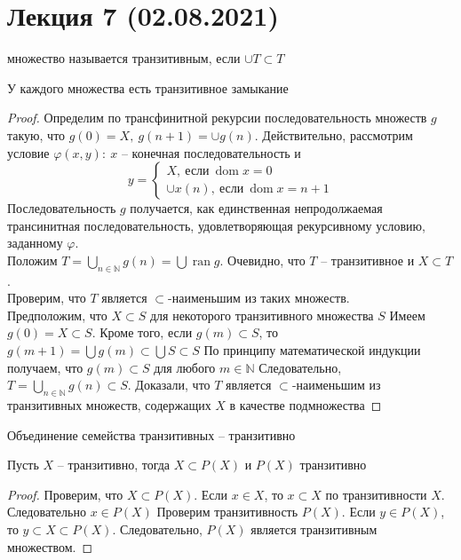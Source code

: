 \section{Лекция 7 (02.08.2021)}

\begin{defn}
множество называется транзитивным, если $\cup T \subset T$
\end{defn}

\begin{lem}
 У каждого множества есть транзитивное замыкание
\end{lem}
\begin{proof}
Определим по трансфинитной рекурсии последовательность множеств $g$ такую, что $g(0) = X,\ g(n+1) = \cup g(n)$. Действительно, рассмотрим условие $\varphi(x,y):\ x$ -- конечная последовательность и
$$
y =
\begin{cases}
	X,\ \text{если}\ \operatorname{dom} x = 0\\
	\cup x(n),\ \text{если}\ \operatorname{dom} x = n+1
\end{cases}
$$
Последовательность $g$ получается, как единственная непродолжаемая трансинитная последовательность, удовлетворяющая рекурсивному условию, заданному $\varphi$.\\
Положим $T = \bigcup_{n \in \mathbb{N}} g(n) = \bigcup \operatorname{ran} g$. Очевидно, что $T$ -- транзитивное и $X \subset T$.\\
Проверим, что $T$ является $\subset$-наименьшим из таких множеств.\\
Предположим, что $X \subset S$ для некоторого транзитивного множества $S$
\vskip 0.1in
Имеем $g(0) = X \subset S$. Кроме того, если $g(m) \subset S$, то $g(m+1) = \bigcup g(m) \subset \bigcup S \subset S$
\vskip 0.1in
По принципу математической индукции получаем, что $g(m) \subset S$ для любого $m \in \mathbb{N}$
\vskip 0.1in
Следовательно, $T = \bigcup_{n \in \mathbb{N}} g(n) \subset S$. Доказали, что $T$ является $\subset$-наименьшим из транзитивных множеств, содержащих $X$ в качестве подмножества
\end{proof}

\begin{lem}
Объединение семейства транзитивных -- транзитивно
\end{lem}
\begin{lem}
Пусть $X$ -- транзитивно, тогда $X \subset P(X)$ и $P(X)$ транзитивно
\end{lem}
\begin{proof}
Проверим, что $X \subset P(X)$. Если $x \in X$, то $x \subset X$ по транзитивности $X$. Следовательно $x \in P(X)$
\vskip 0.1in
Проверим транзитивность $P(X)$. Если $y \in P(X)$, то $y \subset X \subset P(X)$. Следовательно, $P(X)$ является транзитивным множеством.
\end{proof}

